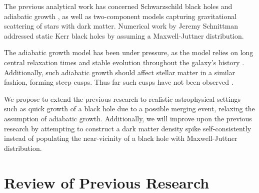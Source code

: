 \documentclass[12pt]{article}
\begin{document}

The previous analytical work has concerned Schwarzschild black holes 
and adiabatic growth \citep{GS_1999, Sadeghian_Ferrer_Will_2013}, as well 
as two-component models capturing gravitational scattering of stars 
with dark matter. Numerical work by Jeremy Schnittman 
addressed static Kerr black holes by assuming a Maxwell-Juttner 
distribution.

The adiabatic growth model has been under pressure, as 
the model relies on long central relaxation times and stable 
evolution throughout the galaxy's history 
\citep{ullio2001spike_criticism, merritt2002merger_criticism, bertone2005}.
Additionally, such adiabatic growth should affect stellar matter 
in a similar fashion, forming steep cusps. Thus far such cusps have not been 
observed \citep{merritt2006dynamics}. %


We propose to extend the previous research to realistic astrophysical 
settings such as quick growth of a black hole due to a possible merging event, 
relaxing the assumption of adiabatic growth. Additionally, 
we will improve upon the previous research by attempting to 
construct a dark matter density spike self-consistently instead of 
populating the near-vicinity of a black hole with Maxwell-Juttner distribution.

\section{Review of Previous Research}
\end{document}
